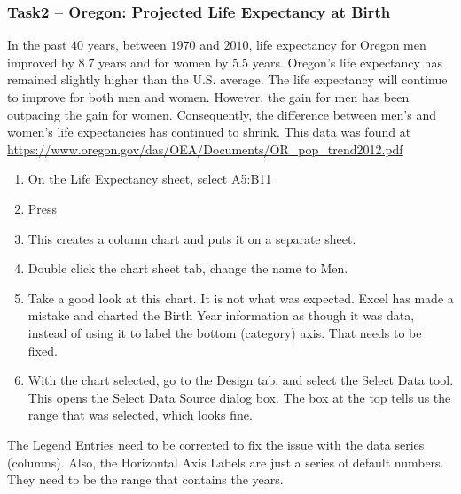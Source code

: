 \subsubsection{Task2 – Oregon: Projected Life Expectancy at Birth}

In the past $ 40 $ years, between $ 1970 $ and $ 2010 $, life expectancy for Oregon men improved by $ 8.7 $ years and for women by $ 5.5 $ years. Oregon's life expectancy has remained slightly higher than the U.S. average. The life expectancy will continue to improve for both men and women. However, the gain for men has been outpacing the gain for women. Consequently, the difference between men's and women's life expectancies has continued to shrink. This data was found at \url{https://www.oregon.gov/das/OEA/Documents/OR_pop_trend2012.pdf}

\begin{enumerate}
	\item On the Life Expectancy sheet, select \textsf{A5:B11}
	\item Press 
	\item This creates a column chart and puts it on a separate sheet.
	\item Double click the chart sheet tab, change the name to Men.
	\item Take a good look at this chart. It is not what was expected. Excel has made a mistake and charted the Birth Year information as though it was data, instead of using it to label the bottom (category) axis. That needs to be fixed.
	\item With the chart selected, go to the Design tab, and select the Select Data tool. This opens the Select Data Source dialog box. The box at the top tells us the range that was selected, which looks fine. 
\end{enumerate}
	
The Legend Entries need to be corrected to fix the issue with the data series (columns). Also, the Horizontal Axis Labels are just a series of default numbers. They need to be the range that contains the years.

